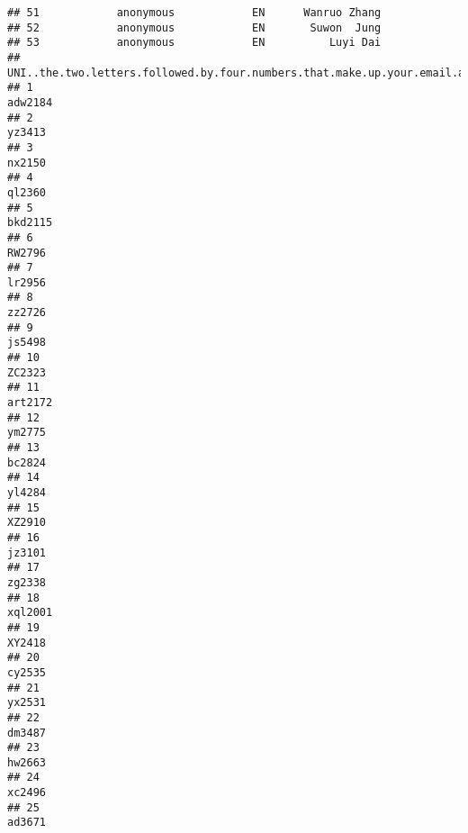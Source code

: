 \documentclass[]{article}
\begin{document}
\begin{verbatim}
## 51            anonymous            EN      Wanruo Zhang
## 52            anonymous            EN       Suwon  Jung
## 53            anonymous            EN          Luyi Dai
##    UNI..the.two.letters.followed.by.four.numbers.that.make.up.your.email.address..eg.kh4513.
## 1                                                                                    adw2184
## 2                                                                                     yz3413
## 3                                                                                     nx2150
## 4                                                                                     ql2360
## 5                                                                                    bkd2115
## 6                                                                                     RW2796
## 7                                                                                     lr2956
## 8                                                                                     zz2726
## 9                                                                                     js5498
## 10                                                                                    ZC2323
## 11                                                                                   art2172
## 12                                                                                    ym2775
## 13                                                                                    bc2824
## 14                                                                                    yl4284
## 15                                                                                    XZ2910
## 16                                                                                    jz3101
## 17                                                                                    zg2338
## 18                                                                                   xql2001
## 19                                                                                    XY2418
## 20                                                                                    cy2535
## 21                                                                                    yx2531
## 22                                                                                    dm3487
## 23                                                                                    hw2663
## 24                                                                                    xc2496
## 25                                                                                    ad3671

\end{verbatim}
\end{document}
